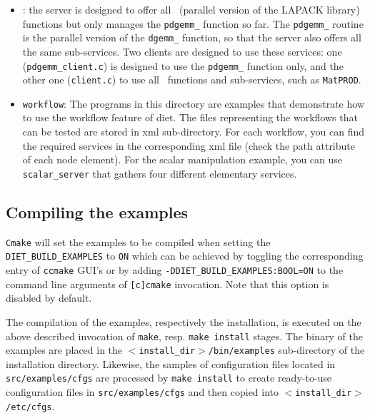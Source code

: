 \begin{itemize}
\item{\texttt{\scalapack}}: the server is designed to offer all
  \scalapack\  (parallel version of the LAPACK library) functions but only
  manages the \texttt{pdgemm\_} function so far. The \texttt{pdgemm\_} routine
  is the parallel version of the \texttt{dgemm\_} function, so that the server
  also offers all the same sub-services. Two clients are designed to use these
  services: one (\texttt{pdgemm\_client.c}) is designed to use the
  \texttt{pdgemm\_} function only, and the other one (\texttt{client.c}) to use
  all \scalapack\ functions and sub-services, such as \texttt{MatPROD}.

\item{\texttt{workflow}}: The programs in this directory are examples that
  demonstrate how to use the workflow feature of diet.  The files representing
  the workflows that can be tested are stored in xml sub-directory. For each
  workflow, you can find the required services in the corresponding xml file
  (check the path attribute of each node element).  For the scalar manipulation
  example, you can use \texttt{scalar\_server} that gathers four different
  elementary services.
\end{itemize}

\subsection{Compiling the examples}
\label{subsection:compiling-examples}

\verb+Cmake+ will set the examples to be compiled when setting the
\verb+DIET_BUILD_EXAMPLES+ to \verb+ON+ which can be achieved by
toggling the corresponding entry of \verb+ccmake+ GUI's or by adding
\verb+-DDIET_BUILD_EXAMPLES:BOOL=ON+ to the command line arguments of
\verb+[c]cmake+ invocation. Note that this option is disabled by
default.

The compilation of the examples, respectively the installation, is executed on
the above described invocation of \verb+make+, resp. \verb+make install+
stages. The binary of the examples are placed in the
\texttt{$<$install\_dir$>$/bin/examples} sub-directory of the installation
directory. Likewise, the samples of configuration files located in
\texttt{src/examples/cfgs} are processed by \texttt{make install} to create
ready-to-use configuration files in \texttt{src/examples/cfgs} and then copied
into \texttt{$<$install\_dir$>$/etc/cfgs}.

